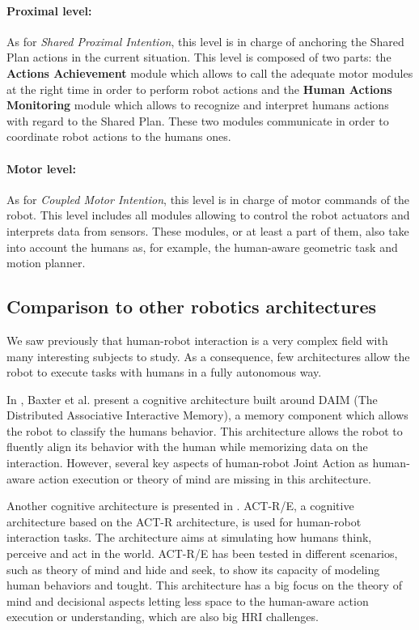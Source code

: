 \documentclass[english,a4paper,11pt,twoside]{StyleThese}
\begin{document}
\paragraph{Proximal level:}
As for \textit{Shared Proximal Intention}, this level is in charge of anchoring the Shared Plan actions in the current situation. This level is composed of two parts: the \textbf{Actions Achievement} module which allows to call the adequate motor modules at the right time in order to perform robot actions and the \textbf{Human Actions Monitoring} module which allows to recognize and interpret humans actions with regard to the Shared Plan. These two modules communicate in order to coordinate robot actions to the humans ones.

\paragraph{Motor level:}
As for \textit{Coupled Motor Intention}, this level is in charge of motor commands of the robot. This level includes all modules allowing to control the robot actuators and interprets data from sensors. These modules, or at least a part of them, also take into account the humans as, for example, the human-aware geometric task and motion planner.

\subsection{Comparison to other robotics architectures}

We saw previously that human-robot interaction is a very complex field with many interesting subjects to study. As a consequence, few architectures allow the robot to execute tasks with humans in a fully autonomous way. 

In \cite{baxter2013cognitive}, Baxter et al. present a cognitive architecture built around DAIM (The Distributed Associative Interactive Memory), a memory component which allows the robot to classify the humans behavior. This architecture allows the robot to fluently align its behavior with the human while memorizing data on the interaction. However, several key aspects of human-robot Joint Action as human-aware action execution or theory of mind are missing in this architecture. 

Another cognitive architecture is presented in \cite{trafton2013act}. ACT-R/E, a cognitive architecture based on the ACT-R architecture, is used for human-robot interaction tasks. The architecture aims at simulating how humans think, perceive and act in the world. ACT-R/E has been tested in different scenarios, such as theory of mind and hide and seek, to show its capacity of modeling human behaviors and tought. This architecture has a big focus on the theory of mind and decisional aspects letting less space to the human-aware action execution or understanding, which are also big HRI challenges. 
\end{document}

